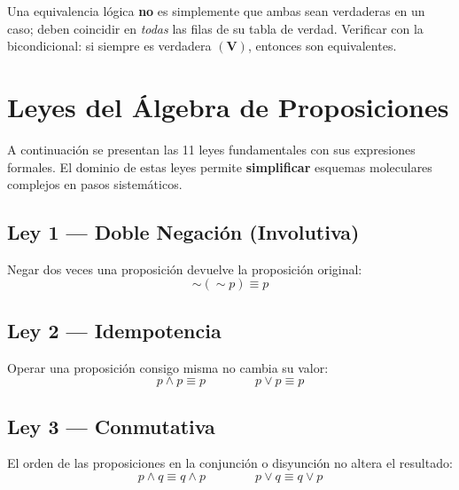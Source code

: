 \begin{cajatip}
  Una equivalencia lógica \textbf{no} es simplemente que ambas sean
  verdaderas en un caso; deben coincidir en \textit{todas} las filas de
  su tabla de verdad. Verificar con la bicondicional: si siempre es
  verdadera $(\mathbf{V})$, entonces son equivalentes.
\end{cajatip}

\section{Leyes del \'{A}lgebra de Proposiciones}

A continuación se presentan las 11 leyes fundamentales con sus expresiones
formales. El dominio de estas leyes permite \textbf{simplificar} esquemas
moleculares complejos en pasos sistemáticos.

\subsection{Ley 1 — Doble Negación (Involutiva)}

\begin{cajaprop}
  Negar dos veces una proposición devuelve la proposición original:
  \[
    \sim(\sim p) \equiv p
  \]
\end{cajaprop}

\subsection{Ley 2 — Idempotencia}

\begin{cajaprop}[2 — Idempotencia]
  Operar una proposición consigo misma no cambia su valor:
  \[
    p \wedge p \equiv p \qquad\qquad p \vee p \equiv p
  \]
\end{cajaprop}

\subsection{Ley 3 — Conmutativa}

\begin{cajaprop}[3 — Conmutativa]
  El orden de las proposiciones en la conjunción o disyunción no altera
  el resultado:
  \[
    p \wedge q \equiv q \wedge p \qquad\qquad p \vee q \equiv q \vee p
  \]
\end{cajaprop}

